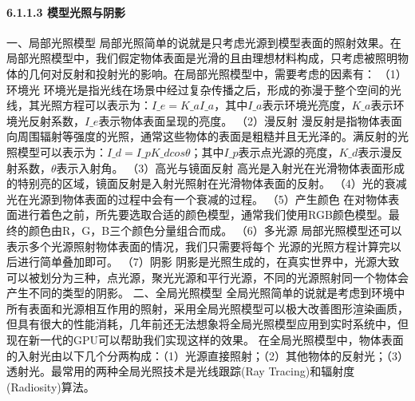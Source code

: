 {{\paragraph{6.1.1.3 模型光照与阴影}\label{ux6a21ux578bux5149ux7167ux4e0eux9634ux5f71} 一、局部光照模型
局部光照简单的说就是只考虑光源到模型表面的照射效果。在局部光照模型中，我们假定物体表面是光滑的且由理想材料构成，只考虑被照明物体的几何对反射和投射光的影响。在局部光照模型中，需要考虑的因素有： （1）环境光
环境光是指光线在场景中经过复杂传播之后，形成的弥漫于整个空间的光线，其光照方程可以表示为：\(I\_e=K\_aI\_a\)，其中\(I\_a\)表示环境光亮度，\(K\_a\)表示环境光反射系数，\(I\_e\)表示物体表面呈现的亮度。
（2）漫反射 漫反射是指物体表面向周围辐射等强度的光照，通常这些物体的表面是粗糙并且无光泽的。满反射的光照模型可以表示为：\(I\_d=I\_pK\_d cos
\theta\)；其中\(I\_p\)表示点光源的亮度，\(K\_d\)表示漫反射系数，\(\theta\)表示入射角。 （3）高光与镜面反射 高光是入射光在光滑物体表面形成的特别亮的区域，镜面反射是入射光照射在光滑物体表面的反射。
（4）光的衰减 光在光源到物体表面的过程中会有一个衰减的过程。 （5）产生颜色 在对物体表面进行着色之前，所先要选取合适的颜色模型，通常我们使用RGB颜色模型。最终的颜色由R，G，B三个颜色分量组合而成。 （6）多光源
局部光照模型还可以表示多个光源照射物体表面的情况，我们只需要将每个 光源的光照方程计算完以后进行简单叠加即可。 （7）阴影
阴影是光照生成的，在真实世界中，光源大致可以被划分为三种，点光源，聚光光源和平行光源，不同的光源照射同一个物体会产生不同的类型的阴影。 二、全局光照模型
全局光照简单的说就是考虑到环境中所有表面和光源相互作用的照射，采用全局光照模型可以极大改善图形渲染画质，但具有很大的性能消耗，几年前还无法想象将全局光照模型应用到实时系统中，但现在新一代的GPU可以帮助我们实现这样的效果。
在全局光照模型中，物体表面的入射光由以下几个分两构成：（1）光源直接照射；（2）其他物体的反射光；（3）透射光。最常用的两种全局光照技术是光线跟踪(Ray Tracing)和辐射度(Radiosity)算法。
}}
